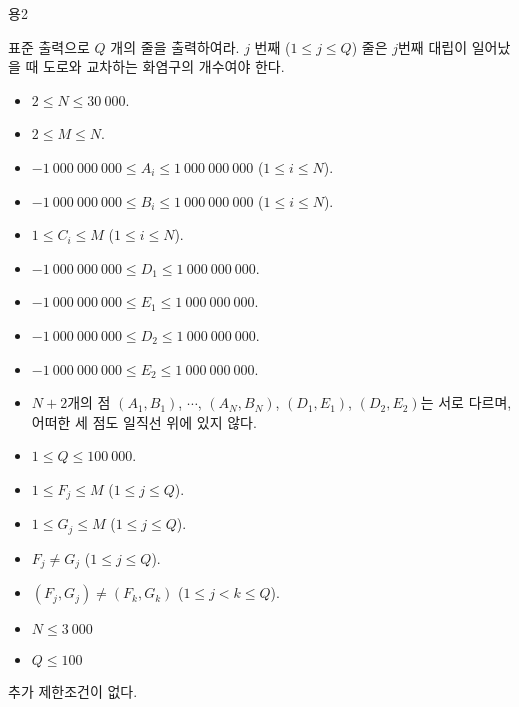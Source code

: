 \begin{problem}{용2}
	
	\OutputFile
	
	표준 출력으로 $Q$ 개의 줄을 출력하여라. $j$ 번째 ($1 \le j \le Q$) 줄은 $j$번째 대립이 일어났을 때 도로와 교차하는 화염구의 개수여야 한다.
	
	\Constraints
	
	\begin{itemize}
		\item $2 \le N \le 30\ 000$.
		\item $2 \le M \le N$.
		\item $-1\ 000\ 000\ 000 \le A_i \le 1\ 000\ 000\ 000$ ($1 \le i \le N$).
		\item $-1\ 000\ 000\ 000 \le B_i \le 1\ 000\ 000\ 000$ ($1 \le i \le N$).
		\item $1 \le C_i \le M$ ($1 \le i \le N$).
		\item $-1\ 000\ 000\ 000 \le D_1 \le 1\ 000\ 000\ 000$.
		\item $-1\ 000\ 000\ 000 \le E_1 \le 1\ 000\ 000\ 000$.
		\item $-1\ 000\ 000\ 000 \le D_2 \le 1\ 000\ 000\ 000$.
		\item $-1\ 000\ 000\ 000 \le E_2 \le 1\ 000\ 000\ 000$.
		\item $N+2$개의 점 $(A_1, B_1)$, $\cdots$, $(A_N, B_N)$, $(D_1, E_1)$, $(D_2, E_2)$는 서로 다르며, 어떠한 세 점도 일직선 위에 있지 않다.
		\item $1 \le Q \le 100\ 000$.
		\item $1 \le F_j \le M$ ($1 \le j \le Q$).
		\item $1 \le G_j \le M$ ($1 \le j \le Q$).
		\item $F_j \ne G_j$ ($1 \le j \le Q$).
		\item $(F_j, G_j) \ne (F_k, G_k)$ ($1 \le j < k \le Q$).
	\end{itemize}
	
	
	\begin{itemize}
		\item $N \le 3\ 000$
	\end{itemize}
	
	\begin{itemize}
		\item $Q \le 100$
	\end{itemize}
	
	
	추가 제한조건이 없다.
	
	\Examples
	
	\begin{example}
	\end{example}
	

\end{problem}
